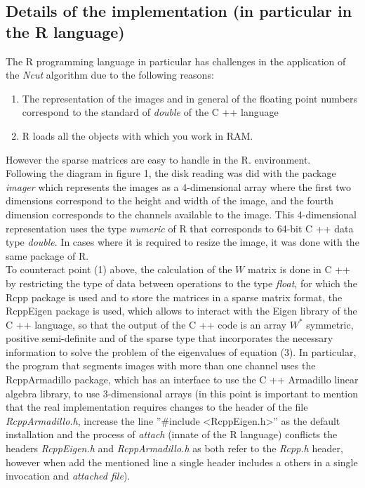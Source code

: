 \documentclass[conference]{IEEEtran}
\begin{document}
\subsection{Details of the implementation (in particular in the R language)}
The R programming language in particular has challenges in the application of the \textit{Ncut} algorithm due to the following reasons:
\begin{enumerate}
\item The representation of the images and in general of the floating point numbers correspond to the standard of \textit {double} of the C ++ language
\item R loads all the objects with which you work in RAM.
\end{enumerate}
However the sparse matrices are easy to handle in the R. environment.\\
Following the diagram in figure 1, the disk reading was did with the package \textit{imager} \cite{imager} which represents the images as a 4-dimensional array where the first two dimensions correspond to the height and width of the image, and the fourth dimension corresponds to the channels available to the image. This 4-dimensional representation uses the type \textit{numeric} of R that corresponds to 64-bit C ++ data type \textit{double}. In cases where it is required to resize the image, it was done with the same package of R. \\
To counteract point (1) above, the calculation of the $ W $ matrix is done in C ++ by restricting the type of data between operations to the type \textit{float}, for which the Rcpp \cite{Rcpp} package is used and to store the matrices in a sparse matrix format, the RcppEigen \cite{RcppEigen} package is used, which allows to interact with the Eigen library of the C ++ language, so that the output of the C ++ code is an array $ W ^ * $ symmetric, positive semi-definite and of the sparse type that incorporates the necessary information to solve the problem of the eigenvalues of equation (3).
In particular, the program that segments images with more than one channel uses the RcppArmadillo \cite{RcppArmadillo} package, which has an interface to use the C ++ Armadillo linear algebra library, to use 3-dimensional arrays (in this point is important to mention that the real implementation requires changes to the header of the file \textit{RcppArmadillo.h}, increase the line ''\#include <RcppEigen.h>'' as the default installation and the process of \textit {attach} (innate of the R language) conflicts the headers \textit {RcppEigen.h} and \textit {RcppArmadillo.h} as both refer to the \textit {Rcpp.h} header, however when add the mentioned line a single header includes a others in a single invocation and \textit {attached file}). \\
\end{document}
